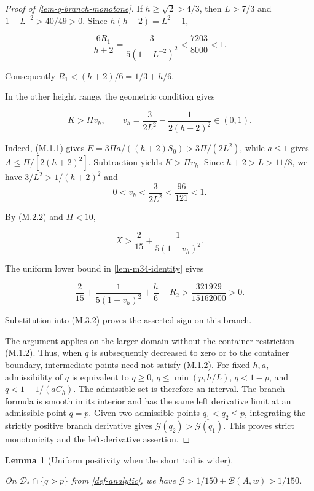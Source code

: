 \documentclass[11pt,a4paper]{article}
\theoremstyle{proofmanuscript}
\newtheorem{lemma}[theorem]{Lemma}
\begin{document}
\begin{proof}[Proof of \ref{lem-q-branch-monotone}]
If \(h\ge\sqrt2>4/3\), then \(L>7/3\) and \(1-L^{-2}>40/49>0\). Since \(h(h+2)=L^2-1\),

\[
\frac{6R_1}{h+2}
=\frac3{5(1-L^{-2})^2}
<\frac{7203}{8000}<1.
\]

Consequently \(R_1<(h+2)/6=1/3+h/6\).

In the other height range, the geometric condition gives

\[
K>\Pi v_h,\qquad v_h=\frac3{2L^2}-\frac1{2(h+2)^2}\in(0,1).
\]

Indeed, (M.1.1) gives \(E=3\Pi a/((h+2)S_0)>3\Pi/(2L^2)\), while \(a\le1\) gives \(A\le\Pi/[2(h+2)^2]\). Subtraction yields \(K>\Pi v_h\). Since \(h+2>L>11/8\), we have \(3/L^2>1/(h+2)^2\) and \[
0<v_h<\frac3{2L^2}<\frac{96}{121}<1.
\]

By (M.2.2) and \(\Pi<10\),

\[
X>\frac2{15}+\frac1{5(1-v_h)^2}.
\]

The uniform lower bound in \ref{lem-m34-identity} gives

\[
\frac2{15}+\frac1{5(1-v_h)^2}+\frac h6-R_2
>\frac{321929}{15162000}>0.
\]

Substitution into (M.3.2) proves the asserted sign on this branch.

The argument applies on the larger domain without the container restriction (M.1.2). Thus, when \(q\) is subsequently decreased to zero or to the container boundary, intermediate points need not satisfy (M.1.2). For fixed \(h,a\), admissibility of \(q\) is equivalent to \(q\ge0\), \(q\le\min(p,h/L)\), \(q<1-p\), and \(q<1-1/(aC_h)\). The admissible set is therefore an interval. The branch formula is smooth in its interior and has the same left derivative limit at an admissible point \(q=p\). Given two admissible points \(q_1<q_2\le p\), integrating the strictly positive branch derivative gives \(\mathcal G(q_2)>\mathcal G(q_1)\). This proves strict monotonicity and the left-derivative assertion.

\end{proof}

\begin{lemma}[Uniform positivity when the short tail is wider]\label{lem-other-branch}

On \(\mathcal D_*\cap\{q>p\}\) from \ref{def-analytic}, we have \(\mathcal G>1/150+\mathcal B(A,w)>1/150\).

\end{lemma}
\end{document}
